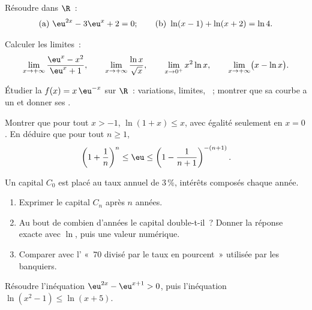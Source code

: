 \begin{exercise}[$\star$]\label{exo:g12:exp:2}
Résoudre dans $\R$~:
\[
\text{(a) } \eu^{2x} - 3\eu^{x} + 2 = 0;
\qquad
\text{(b) } \ln(x - 1) + \ln(x + 2) = \ln 4 .
\]
\end{exercise}

\begin{exercise}[$\star$]\label{exo:g12:exp:3}
Calculer les limites~:
\[
\lim_{x\to+\infty} \frac{\eu^x - x^2}{\eu^x + 1}, \qquad
\lim_{x\to+\infty} \frac{\ln x}{\sqrt x}, \qquad
\lim_{x\to0^+} x^2 \ln x, \qquad
\lim_{x\to+\infty} \bigl(x - \ln x\bigr).
\]
\end{exercise}

\begin{exercise}[$\star\star$]\label{exo:g12:exp:4}
Étudier la  $f(x) = x\,\eu^{-x}$ sur $\R$~: variations, limites,
~; montrer que sa courbe a un  et donner ses
.
\end{exercise}

\begin{exercise}[$\star\star$]\label{exo:g12:exp:5}
Montrer que pour tout $x > -1$, $\ln(1 + x) \leq x$, avec égalité seulement
en $x = 0$. En déduire que pour tout $n \geq 1$,
\[
\left(1 + \frac{1}{n}\right)^n \leq \eu \leq \left(1 - \frac{1}{n+1}\right)^{-(n+1)} .
\]
\end{exercise}

\begin{exercise}[$\star\star$]\label{exo:g12:exp:6}
Un capital $C_0$ est placé au taux annuel de $3\,\%$, intérêts composés
chaque année.
\begin{enumerate}
  \item Exprimer le capital $C_n$ après $n$ années.
  \item Au bout de combien d'années le capital double-t-il~? Donner la
        réponse exacte avec $\ln$, puis une valeur numérique.
  \item Comparer avec l' «~$70$ divisé par le taux en
        pourcent~» utilisée par les banquiers.
\end{enumerate}
\end{exercise}

\begin{exercise}[$\star\star$]\label{exo:g12:exp:7}
Résoudre l'inéquation $\eu^{2x} - \eu^{x+1} > 0$, puis l'inéquation
$\ln(x^2 - 1) \leq \ln(x + 5)$.
\end{exercise}

